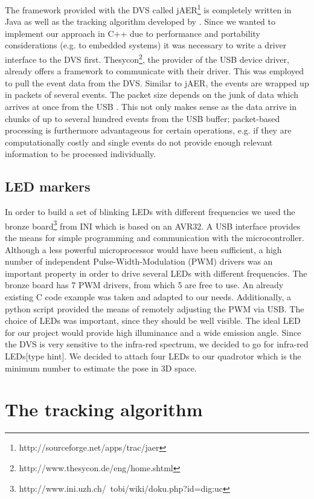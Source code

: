 The framework provided with the DVS called jAER\footnote{http://sourceforge.net/apps/trac/jaer} is completely written in Java as well as the tracking algorithm developed by \cite{Matthias}. Since we wanted to implement our approach in C++ due to performance and portability considerations (e.g. to embedded systems) it was necessary to write a driver interface to the DVS first. Thesycon\footnote{http://www.thesycon.de/eng/home.shtml}, the provider of the USB device driver, already offers a framework to communicate with their driver. This was employed to pull the event data from the DVS. Similar to jAER, the events are wrapped up in packets of several events. The packet size depends on the junk of data which arrives at once from the USB . This not only makes sense as the data arrive in chunks of up to several hundred events from the USB buffer; packet-based processing is furthermore advantageous for certain operations, e.g. if they are computationally costly and single events do not provide enough relevant information to be processed individually. 

\subsection{LED markers}\label{sec:leds}

In order to build a set of blinking LEDs with different frequencies we used the bronze board\footnote{http://www.ini.uzh.ch/~tobi/wiki/doku.php?id=dig:uc} from INI which is based on an AVR32. A USB interface provides the means for simple programming and communication with the microcontroller. Although a less powerful microprocessor would have been sufficient, a high number of independent Pulse-Width-Modulation (PWM) drivers was an important property in order to drive several LEDs with different frequencies. The bronze board has 7 PWM drivers, from which 5 are free to use.  An already existing C code example was taken and adapted to our needs. Additionally, a python script provided the means of remotely adjusting the PWM via USB. 
The choice of LEDs was important, since they should be well visible. The ideal LED for our project would provide high illuminance and a wide emission angle. Since the DVS is very sensitive to the infra-red spectrum, we decided to go for infra-red LEDs[type hint]. We decided to attach four LEDs to our quadrotor which is the minimum number to estimate the pose in 3D space.


\section{The tracking algorithm}\label{sec:tracking}

